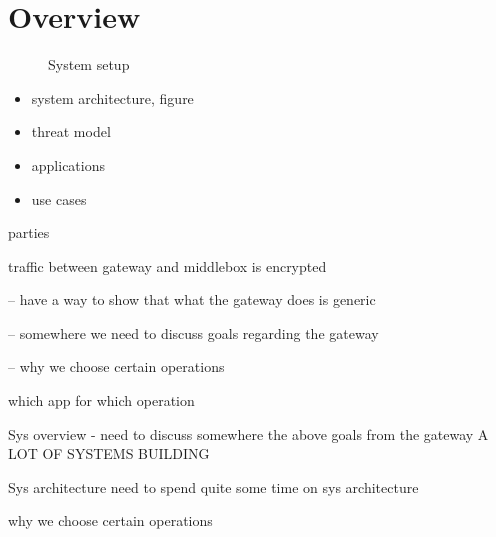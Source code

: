
\section{Overview}\label{sec:overview}


\begin{figure}[t!]
\centering
{}
%
\vfill  
{}
%
\caption{System setup \label{fig:sys-overview}}
\end{figure}

\begin{itemize}
\item system architecture, figure
\item threat model
\item applications
\item use cases
\end{itemize}

parties



traffic between gateway and middlebox is encrypted

-- have a way to show that what the gateway does is generic 
   
-- somewhere we need to discuss goals regarding the gateway

-- why we choose certain operations

which app for which operation

Sys overview
- need to discuss somewhere the above goals from the gateway
A LOT OF SYSTEMS BUILDING

Sys architecture
need to spend quite some time on sys architecture

why we choose certain operations

